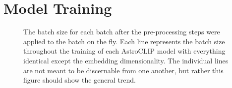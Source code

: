 
\section{Model Training}\label{sec:training}
\begin{figure}[t]
    \centering
    \caption{The batch size for each batch after the pre-processing steps were applied to the batch on the fly.
    Each line represents the batch size throughout the training of each AstroCLIP model with everything identical except the
    embedding dimensionality.
    The individual lines are not meant to be discernable from one another, but rather this figure should show the general trend.}
    \label{fig:train_batch_size}
\end{figure}

